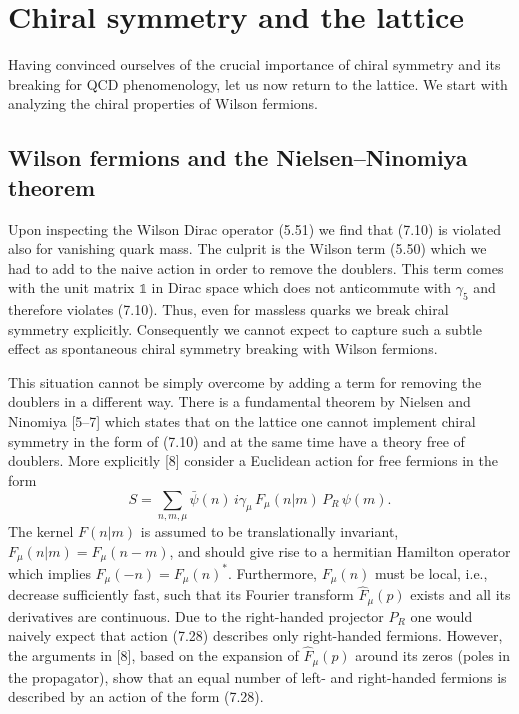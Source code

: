 \section{Chiral symmetry and the lattice}

Having convinced ourselves of the crucial importance of chiral symmetry and
its breaking for QCD phenomenology, let us now return to the lattice. We start
with analyzing the chiral properties of Wilson fermions.

\subsection{Wilson fermions and the Nielsen--Ninomiya theorem}

Upon inspecting the Wilson Dirac operator (5.51) we find that (7.10) is
violated also for vanishing quark mass. The culprit is the Wilson term (5.50)
which we had to add to the naive action in order to remove the doublers. This
term comes with the unit matrix $\mathbb{1}$ in Dirac space which does not
anticommute with $\gamma_5$ and therefore violates (7.10). Thus, even for
massless quarks we break chiral symmetry explicitly. Consequently we cannot
expect to capture such a subtle effect as spontaneous chiral symmetry breaking
with Wilson fermions.

This situation cannot be simply overcome by adding a term for removing the
doublers in a different way. There is a fundamental theorem by Nielsen and
Ninomiya [5--7] which states that on the lattice one cannot implement chiral
symmetry in the form of (7.10) and at the same time have a theory free of
doublers. More explicitly [8] consider a Euclidean action for free fermions in
the form
\begin{equation}
  S = \sum_{n,m,\mu} \bar\psi(n)\,i\gamma_\mu\,F_\mu(n|m)\,P_R\,\psi(m) .
\end{equation}
The kernel $F(n|m)$ is assumed to be translationally invariant,
$F_\mu(n|m) = F_\mu(n-m)$, and should give rise to a hermitian Hamilton
operator which implies $F_\mu(-n) = F_\mu(n)^*$. Furthermore, $F_\mu(n)$ must
be local, i.e., decrease sufficiently fast, such that its Fourier transform
$\hat{F}_\mu(p)$ exists and all its derivatives are continuous. Due to the
right-handed projector $P_R$ one would naively expect that action (7.28)
describes only right-handed fermions. However, the arguments in [8], based on
the expansion of $\hat{F}_\mu(p)$ around its zeros (poles in the propagator),
show that an equal number of left- and right-handed fermions is described by
an action of the form (7.28).

